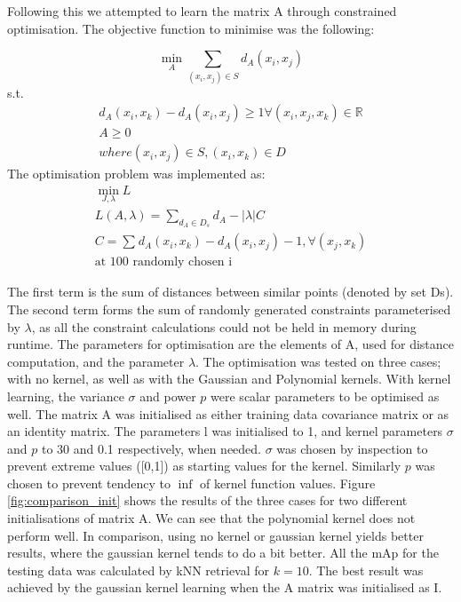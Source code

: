 \documentclass[10pt,technote]{IEEEtran}
\begin{document}
Following this we attempted to learn the matrix A through constrained optimisation. The objective function to minimise was the following:

\begin{equation}
    \min_{A}\sum_{(x_i, x_j) \in S}{d_A (x_i, x_j)}
\end{equation}
s.t.
\begin{equation}
    \begin{aligned}
        d_A{(x_i, x_k)} - d_A (x_i, x_j) \ge 1 \forall(x_i, x_j, x_k) \in{\mathbb{R}}  \\
        A \ge 0 \\
        where (x_i, x_j) \in S, (x_i, x_k) \in D
    \end{aligned}
\end{equation}
The optimisation problem was implemented as: 
\begin{equation}
    \begin{aligned}
    \min_{J,\lambda} L \\
    L(A, \lambda)  = \sum_{d_A \in D_s}d_A - |\lambda|C \\
        C = \sum_{}d_A{(x_i, x_k)} - d_A (x_i, x_j) -1,  \forall(x_j, x_k)  \\ \text{at 100 randomly chosen i}
    \end{aligned}
\end{equation}

The first term is the sum of distances between similar points (denoted by set Ds). The second term forms the sum of randomly generated constraints parameterised by $\lambda$, as all the constraint calculations could not be held in memory during runtime. The parameters for optimisation are the elements of A, used for distance computation, and the parameter $\lambda$. The optimisation was tested on three cases; with no kernel, as well as with the Gaussian and Polynomial kernels. With kernel learning, the variance $\sigma$ and power $p$ were scalar parameters to be optimised as well. The matrix A was initialised as either training data covariance matrix or as an identity matrix. The parameters l was initialised to 1, and kernel parameters $\sigma$ and $p$ to 30 and 0.1 respectively, when needed. $\sigma$ was chosen by inspection to prevent extreme values ([0,1]) as starting values for the kernel. Similarly $p$ was chosen to prevent tendency to $\inf$ of kernel function values.
Figure \ref{fig:comparison_init} shows the results of the three cases for two different initialisations of matrix A. We can see that the polynomial kernel does not perform well. In comparison, using no kernel or gaussian kernel yields better results, where  the gaussian kernel tends to do a bit better.
All the mAp for the testing data was calculated by kNN retrieval for $k = 10$.
The best result was achieved by the gaussian kernel learning when the A matrix was initialised as I.
\end{document}
